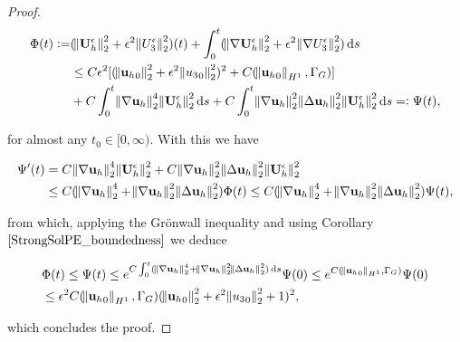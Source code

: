 \documentclass[11pt]{article}
\newcommand*\diff{\mathop{}\!\mathrm{d}}
\begin{document}
\begin{proof}
\begin{equation}
  \begin{split} \nonumber
  \Phi (t):= & (\norm{\mathbf{U}_h^\epsilon}_2^2 + \epsilon^2 \norm{U_3^\epsilon}_2^2)(t) + \int_0^t (\norm{\nabla \mathbf{U}_h^\epsilon}_2^2 + \epsilon^2 \norm{\nabla U_3^\epsilon}_2^2) \diff s \\
  & \leq C \epsilon^2 [(\norm{{\mathbf{u}_h}_0}_2^2 + \epsilon^2 \norm{{u_3}_0}_2^2)^2 + C(\norm{{\mathbf{u}_h}_0}_{H^1}, \Gamma_G)] \\
  & + C \int_0^{t} \norm{\nabla \mathbf{u}_h}_2^4 \norm{\mathbf{U}_h^\epsilon}_2^2 \diff s + C \int_0^{t} \norm{\nabla \mathbf{u}_h}_2^2  \norm{\Delta \mathbf{u}_h}_2^2 \norm{\mathbf{U}_h^\epsilon}_2^2 \diff s =: \Psi(t),
  \end{split}
\end{equation}

for almost any $t_0 \in [0, \infty).$ With this we have

\begin{equation}
  \begin{split} \nonumber
   \Psi'(t) & = C \norm{\nabla \mathbf{u}_h}_2^4 \norm{\mathbf{U}_h^\epsilon}_2^2 + C \norm{\nabla \mathbf{u}_h}_2^2  \norm{\Delta \mathbf{u}_h}_2^2 \norm{\mathbf{U}_h^\epsilon}_2^2 \\
   & \leq C (\norm{\nabla \mathbf{u}_h}_2^4 + \norm{\nabla \mathbf{u}_h}_2^2  \norm{\Delta \mathbf{u}_h}_2^2) \Phi (t) \leq C (\norm{\nabla \mathbf{u}_h}_2^4 + \norm{\nabla \mathbf{u}_h}_2^2  \norm{\Delta \mathbf{u}_h}_2^2)\Psi(t),
  \end{split}
\end{equation}

from which, applying the Gr\"onwall inequality and using Corollary $\ref{StrongSolPE_boundedness}$ we deduce

\begin{equation}
  \begin{split} \nonumber
    & \Phi (t) \leq \Psi (t) \leq e^{C \int_0 ^ t (\norm{\nabla \mathbf{u}_h}_2^4 + \norm{\nabla \mathbf{u}_h}_2^2  \norm{\Delta \mathbf{u}_h}_2^2) \diff s} \Psi (0) \leq e^{C(\norm{{\mathbf{u}_h}_0}_{H^1}, \Gamma_G)} \Psi(0) \\
    & \leq \epsilon^2 C(\norm{{\mathbf{u}_h}_0}_{H^1}, \Gamma_G) (\norm{{\mathbf{u}_h}_0}_2^2 + \epsilon^2 \norm{{u_3}_0}_2^2 + 1)^2,
  \end{split}
\end{equation}

which concludes the proof.
  
\end{proof}
\end{document}
